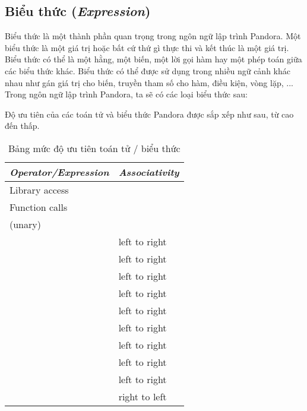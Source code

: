 \subsection{Biểu thức (\textit{Expression})}
\label{ch2:expr}

Biểu thức là một thành phần quan trọng trong ngôn ngữ lập trình Pandora. Một biểu thức là một giá trị hoặc bất cứ thứ gì thực thi và kết thúc là một giá trị. Biểu thức có thể là một hằng, một biến, một lời gọi hàm hay một phép toán giữa các biểu thức khác. Biểu thức có thể được sử dụng trong nhiều ngữ cảnh khác nhau như gán giá trị cho biến, truyền tham số cho hàm, điều kiện, vòng lặp, ... Trong ngôn ngữ lập trình Pandora, ta sẽ có các loại biểu thức sau:

\regexexpr

Độ ưu tiên của các toán tử và biểu thức Pandora được sắp xếp như sau, từ cao đến thấp. 

\begin{longtable}{| l | l |}
    \caption{Bảng mức độ ưu tiên toán tử / biểu thức}
    \label{table2:precedence}\\
\hline
\textbf{\textit{Operator/Expression}} & \textbf{\textit{Associativity}} \\
\hline
Library access & \\
\hline
Function calls & \\
\hline
\w{\kw{!}} \w{\kw{-}} (unary) & \\
\hline
\w{\kw{*}} \w{\kw{/}} \w{\kw{\%}} & left to right \\
\hline
\w{\kw{+}} \w{\kw{-}} & left to right \\
\hline
\w{\kw{<}\kw{<}} \w{\kw{>}\kw{>}} & left to right \\
\hline
\w{\kw{\&}} & left to right \\
\hline
\w{\kw{$\wedge$}} & left to right \\
\hline
\w{\kw{|}} & left to right \\
\hline
\w{\kw{==}} \w{\kw{!=}} \w{\kw{<}} \w{\kw{>}} \w{\kw{<=}} \w{\kw{>=}} & left to right \\
\hline
\w{\kw{\&\&}} & left to right \\
\hline
\w{\kw{|\,|}} & left to right \\
\hline
\w{\kw{=}} \w{\kw{+=}} \w{\kw{-=}} \w{\kw{*=}} \w{\kw{/=}} \w{\kw{\%=}} \w{\kw{<}\kw{<=}} \w{\kw{>}\kw{>=}} \w{\kw{\&=}} \w{\kw{$\wedge$=}} \w{\kw{|=}} & right to left \\
\hline
\end{longtable}

